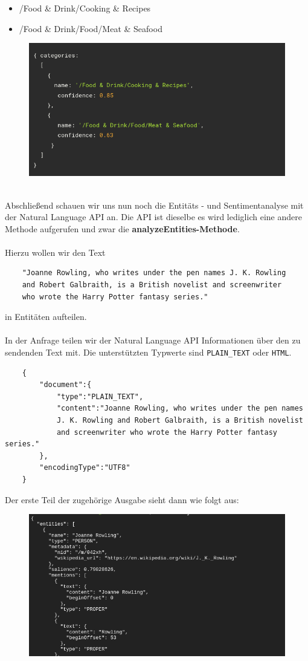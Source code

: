 \documentclass[12pt,a4paper]{article}
\begin{document}
\begin{itemize}
	\item /Food \& Drink/Cooking \& Recipes
	\item /Food \& Drink/Food/Meat \& Seafood
\end{itemize}
\newpage
\begin{figure}[h!]
	\centering
	\includegraphics[width=0.8\linewidth]{../images/response_category}
	\label{fig:responsecategory}
\end{figure}
\ \\
Abschließend schauen wir uns nun noch die Entitäts - und Sentimentanalyse mit der Natural Language API an. Die API ist dieselbe es wird lediglich eine andere Methode aufgerufen und zwar die \textbf{analyzeEntities-Methode}.
\\ \\
Hierzu wollen wir den Text
\begin{verbatim}
	"Joanne Rowling, who writes under the pen names J. K. Rowling
	and Robert Galbraith, is a British novelist and screenwriter 
	who wrote the Harry Potter fantasy series."
\end{verbatim}
in Entitäten aufteilen. 
\\ \\
In der Anfrage teilen wir der Natural Language API Informationen über den zu sendenden Text mit. Die unterstützten Typwerte sind \texttt{PLAIN\_TEXT} oder \texttt{HTML}.
\begin{verbatim}
	{
		"document":{
			"type":"PLAIN_TEXT",
			"content":"Joanne Rowling, who writes under the pen names 
			J. K. Rowling and Robert Galbraith, is a British novelist 
			and screenwriter who wrote the Harry Potter fantasy series."
		},
		"encodingType":"UTF8"
	}
\end{verbatim}
Der erste Teil der zugehörige Ausgabe sieht dann wie folgt aus:
\newpage
\begin{figure}[h!]
	\centering
	\includegraphics[width=1\linewidth]{../images/entity}
	\label{fig:entity}
\end{figure}
\end{document}
